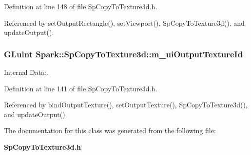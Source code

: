 Definition at line 148 of file Sp\-Copy\-To\-Texture3d.h.

Referenced by set\-Output\-Rectangle(), set\-Viewport(), Sp\-Copy\-To\-Texture3d(), and update\-Output().
\subsubsection{\setlength{\rightskip}{0pt plus 5cm}GLuint {\bf Spark::Sp\-Copy\-To\-Texture3d::m\_\-ui\-Output\-Texture\-Id}\hspace{0.3cm}{\tt  [protected]}}\label{classSpark_1_1SpCopyToTexture3d_p0}


Internal Data:. 

Definition at line 141 of file Sp\-Copy\-To\-Texture3d.h.

Referenced by bind\-Output\-Texture(), set\-Output\-Texture(), Sp\-Copy\-To\-Texture3d(), and update\-Output().

The documentation for this class was generated from the following file:\begin{CompactItemize}
\item 
{\bf Sp\-Copy\-To\-Texture3d.h}\end{CompactItemize}
